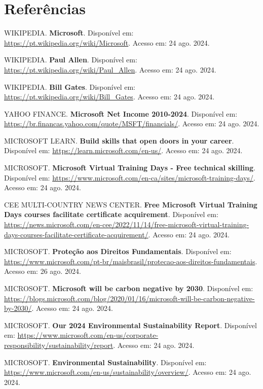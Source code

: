 \newpage
{} %

\section{Referências}

\vspace{0.5cm} %

\noindent WIKIPEDIA. \textbf{Microsoft}. Disponível em: \url{https://pt.wikipedia.org/wiki/Microsoft}. Acesso em: 24 ago. 2024.

\noindent WIKIPEDIA. \textbf{Paul Allen}. Disponível em: \url{https://pt.wikipedia.org/wiki/Paul_Allen}. Acesso em: 24 ago. 2024.

\noindent WIKIPEDIA. \textbf{Bill Gates}. Disponível em: \url{https://pt.wikipedia.org/wiki/Bill_Gates}. Acesso em: 24 ago. 2024.

\noindent YAHOO FINANCE. \textbf{Microsoft Net Income 2010-2024}. Disponível em: \url{https://br.financas.yahoo.com/quote/MSFT/financials/}. Acesso em: 24 ago. 2024.

\noindent MICROSOFT LEARN. \textbf{Build skills that open doors in your career}. Disponível em: \url{https://learn.microsoft.com/en-us/}. Acesso em: 24 ago. 2024.

\noindent MICROSOFT. \textbf{Microsoft Virtual Training Days - Free technical skilling}. Disponível em: \url{https://www.microsoft.com/en-ca/sites/microsoft-training-days/}. Acesso em: 24 ago. 2024.

\noindent CEE MULTI-COUNTRY NEWS CENTER. \textbf{Free Microsoft Virtual Training Days courses facilitate certificate acquirement}. Disponível em: \url{https://news.microsoft.com/en-cee/2022/11/14/free-microsoft-virtual-training-days-courses-facilitate-certificate-acquirement/}. Acesso em: 24 ago. 2024.

\noindent MICROSOFT. \textbf{Proteção aos Direitos Fundamentais}. Disponível em: \url{https://www.microsoft.com/pt-br/maisbrasil/protecao-aos-direitos-fundamentais}. Acesso em: 26 ago. 2024.

\noindent MICROSOFT. \textbf{Microsoft will be carbon negative by 2030}. Disponível em: \url{https://blogs.microsoft.com/blog/2020/01/16/microsoft-will-be-carbon-negative-by-2030/}. Acesso em: 24 ago. 2024.

\noindent MICROSOFT. \textbf{Our 2024 Environmental Sustainability Report}. Disponível em: \url{https://www.microsoft.com/en-us/corporate-responsibility/sustainability/report}. Acesso em: 24 ago. 2024.

\noindent MICROSOFT. \textbf{Environmental Sustainability}. Disponível em: \url{https://www.microsoft.com/en-us/sustainability/overview/}. Acesso em: 24 ago. 2024.



